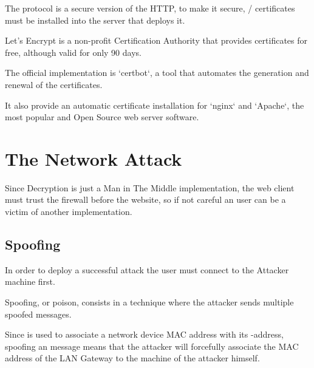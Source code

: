 The  protocol is a secure version of the HTTP, to make it secure, / certificates must be installed into the server that deploys it.

Let's Encrypt is a non-profit Certification Authority that provides  certificates for free, although valid for only 90 days.

The official implementation is `certbot`, a tool that automates the generation and renewal of the certificates.

It also provide an automatic certificate installation for `nginx` and `Apache`, the most popular and Open Source web server software.

\section{The Network Attack}

Since  Decryption is just a Man in The Middle implementation, the web client must trust the firewall before the website, so if not careful an user can be a victim of another  implementation.

\newpage

\subsection{ Spoofing}

In order to deploy a successful  attack the user must connect to the Attacker machine first.

 Spoofing, or  poison, consists in a technique where the attacker sends multiple spoofed  messages.

Since  is used to associate a network device MAC address with its -address, spoofing an  message means that the attacker will forcefully associate the MAC address of the LAN Gateway to the machine of the attacker himself.

